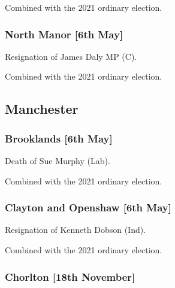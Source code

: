 \documentclass[a4paper,openany]{book}
\begin{document}
\begin{resultsiii}
Combined with the 2021 ordinary election.

\subsubsection*{North Manor \hspace*{\fill}\nolinebreak[1]%
	\enspace\hspace*{\fill}
	[6th May]}


Resignation of James Daly MP (C).

Combined with the 2021 ordinary election.

\subsection*{Manchester}

\subsubsection*{Brooklands \hspace*{\fill}\nolinebreak[1]%
	\enspace\hspace*{\fill}
	[6th May]}


Death of Sue Murphy (Lab).

Combined with the 2021 ordinary election.

\subsubsection*{Clayton and Openshaw \hspace*{\fill}\nolinebreak[1]%
	\enspace\hspace*{\fill}
	[6th May]}


Resignation of Kenneth Dobson (Ind).

Combined with the 2021 ordinary election.

\subsubsection*{Chorlton \hspace*{\fill}\nolinebreak[1]%
	\enspace\hspace*{\fill}
	[18th November]}


\end{resultsiii}
\end{document}
